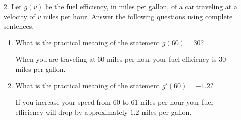 \documentclass[11pt]{article}
\begin{document}
\newsavebox{\quizback}
\begin{lrbox}{\quizback}
\begin{minipage}[top][4.5in][t]{\textwidth} \setlength{\parindent}{1.5em}
\begin{enumerate}
\item[2.] Let $g(v)$ be the fuel efficiency, in miles per gallon, of a car
  traveling at a velocity of $v$ miles per hour. Answer the following
  questions using complete sentences.
  \begin{enumerate}
  \item What is the practical meaning of the statement $g(60) = 30$?

    \vfill
    
    {\color{blue} When you are traveling at 60 miles per hour your
      fuel efficiency is 30 miles per gallon.}

    \vfill
    
  \item What is the practical meaning of the statement $g'(60) = -1.2$?

    \vfill
    
    {\color{blue} If you increase your speed from 60 to 61 miles per
      hour your fuel efficiency will drop by approximately $1.2$ miles
      per gallon.}

    \vfill
    
  \end{enumerate}
\end{enumerate}
\end{minipage}
\end{lrbox}

\noindent \usebox{\quizfront}
\vfill
\noindent \usebox{\quizfront}

\pagebreak
\noindent \usebox{\quizback}
\vfill
\noindent \usebox{\quizback}
\end{document}
